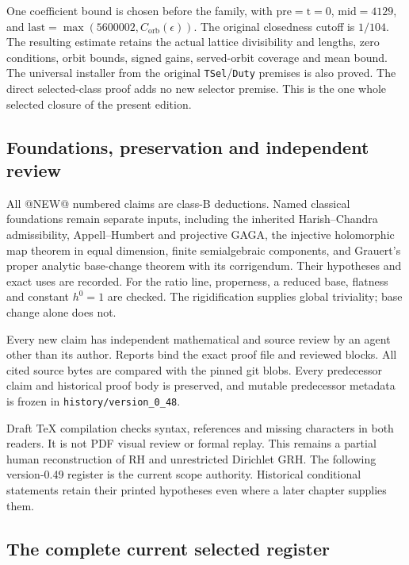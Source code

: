 One coefficient bound is chosen before the family, with
\(\mathrm{pre}=\mathrm{t}=0\), \(\mathrm{mid}=4129\), and
\(\mathrm{last}=\max(5600002,C_{\mathrm{orb}}(\epsilon))\).
The original closedness cutoff is \(1/104\). The resulting estimate
retains the actual lattice divisibility and lengths, zero conditions,
orbit bounds, signed gains, served-orbit coverage and mean bound.
The universal installer from the original \texttt{TSel}/\texttt{Duty}
premises is also proved. The direct selected-class proof adds no
new selector premise. This is the one whole selected closure of
the present edition.

\subsection{Foundations, preservation and independent review}

All @NEW@ numbered claims are class-B deductions. Named classical
foundations remain separate inputs, including the inherited
Harish--Chandra admissibility, Appell--Humbert and projective GAGA,
the injective holomorphic map theorem in equal dimension, finite
semialgebraic components, and Grauert's proper analytic base-change
theorem with its corrigendum. Their hypotheses and exact uses are
recorded. For the ratio line, properness, a reduced base, flatness
and constant \(h^0=1\) are checked. The rigidification supplies
global triviality; base change alone does not.

Every new claim has independent mathematical and source review by
an agent other than its author. Reports bind the exact proof file
and reviewed blocks. All cited source bytes are compared with the
pinned git blobs. Every predecessor claim and historical proof body
is preserved, and mutable predecessor metadata is frozen in
\texttt{history/version\_0\_48}.

Draft TeX compilation checks syntax, references and missing characters
in both readers. It is not PDF visual review or formal replay.
This remains a partial human reconstruction of RH and unrestricted
Dirichlet GRH. The following version-0.49 register is the current
scope authority. Historical conditional statements retain their
printed hypotheses even where a later chapter supplies them.

\subsection{The complete current selected register}


